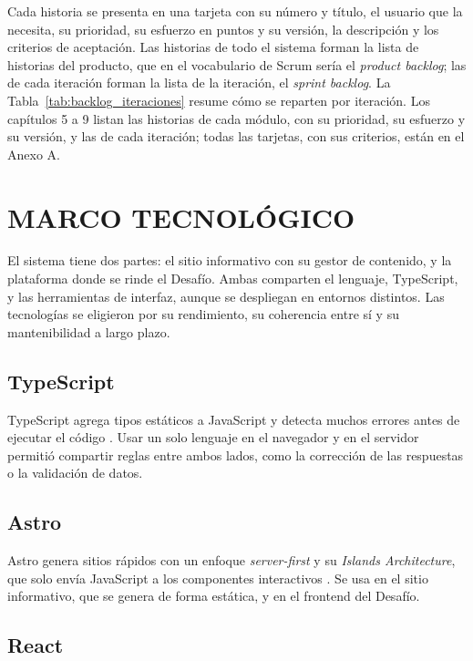 Cada historia se presenta en una tarjeta con su número y título, el usuario que la necesita, su prioridad, su esfuerzo en puntos y su versión, la descripción y los criterios de aceptación. Las historias de todo el sistema forman la lista de historias del producto, que en el vocabulario de Scrum \parencite{schwaber2020} sería el \textit{product backlog}; las de cada iteración forman la lista de la iteración, el \textit{sprint backlog}. La Tabla~\ref{tab:backlog_iteraciones} resume cómo se reparten por iteración. Los capítulos 5 a 9 listan las historias de cada módulo, con su prioridad, su esfuerzo y su versión, y las de cada iteración; todas las tarjetas, con sus criterios, están en el Anexo A.



\section{MARCO TECNOLÓGICO}

El sistema tiene dos partes: el sitio informativo con su gestor de contenido, y la plataforma donde se rinde el Desafío. Ambas comparten el lenguaje, TypeScript, y las herramientas de interfaz, aunque se despliegan en entornos distintos. Las tecnologías se eligieron por su rendimiento, su coherencia entre sí y su mantenibilidad a largo plazo.

\subsection{TypeScript}

TypeScript agrega tipos estáticos a JavaScript y detecta muchos errores antes de ejecutar el código \parencite{typescript}. Usar un solo lenguaje en el navegador y en el servidor permitió compartir reglas entre ambos lados, como la corrección de las respuestas o la validación de datos.

\subsection{Astro}

Astro genera sitios rápidos con un enfoque \textit{server-first} y su \emph{Islands Architecture}, que solo envía JavaScript a los componentes interactivos \parencite{astro}. Se usa en el sitio informativo, que se genera de forma estática, y en el frontend del Desafío.

\subsection{React}

